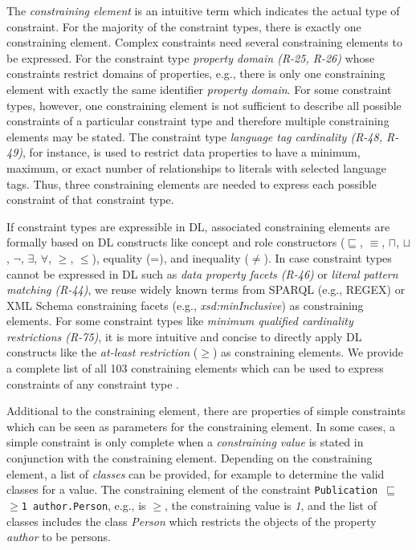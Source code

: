 \documentclass[a4paper,fontsize=11pt]{scrartcl}
\newcommand{\ms}[1]{\texttt{#1}}
\begin{document}

The \emph{constraining element} is an intuitive term which indicates the actual type of constraint. For the majority of the constraint types, there is exactly one constraining element. Complex constraints need several constraining elements to be expressed. For the constraint type \emph{property domain (R-25, R-26)} whose constraints restrict domains of properties, e.g., there is only one constraining element with exactly the same identifier \emph{property domain}. For some constraint types, however, one constraining element is not sufficient to describe all possible constraints of a particular constraint type and therefore multiple constraining elements may be stated. The constraint type \emph{language tag cardinality (R-48, R-49)}, for instance, is used to restrict data properties to have a minimum, maximum, or exact number of relationships to literals with selected language tags. Thus, three constraining elements are needed to express each possible constraint of that constraint type.

If constraint types are expressible in DL, associated constraining elements are formally based on DL constructs like concept and role constructors ($\sqsubseteq$, $\equiv$, $\sqcap$, $\sqcup$, $\neg$, $\exists$, $\forall$, $\geq$, $\leq$), equality (=), and inequality ($\ne$). In case constraint types cannot be expressed in DL such as \emph{data property facets (R-46)} or \emph{literal pattern matching (R-44)}, we reuse widely known terms from SPARQL (e.g., REGEX) or XML Schema constraining facets (e.g., \emph{xsd:minInclusive}) as constraining elements. For some constraint types like \emph{minimum qualified cardinality restrictions (R-75)}, it is more intuitive and concise to directly apply DL constructs like the \emph{at-least restriction} ($\geq$) as constraining elements. We provide a complete list of all 103 constraining elements which can be used to express constraints of any constraint type \cite{BoschNolleAcarEckert2015}. 

Additional to the constraining element, there are properties of simple constraints which can be seen as parameters for the constraining element. In some cases, a simple constraint is only complete when a \emph{constraining value} is stated in conjunction with the constraining element. Depending on the constraining element, a list of \emph{classes} can be provided, for example to determine the valid classes for a value. The constraining element of the constraint {\small\ms{Publication $\sqsubseteq$ $\geq$1 author.Person},} e.g., is \emph{$\geq$}, the constraining value is \emph{1}, and the list of classes includes the class \emph{Person} which restricts the objects of the property \emph{author} to be persons.
\end{document}
